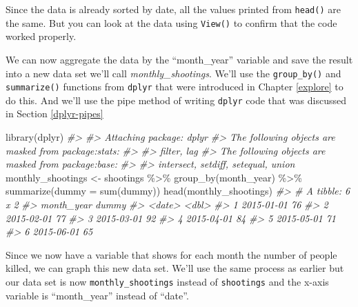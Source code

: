 \documentclass[
]{krantz}
\makeatletter
\newenvironment{Shaded}{\begin{snugshade}}{\end{snugshade}}
\newcommand{\AttributeTok}[1]{\textcolor[rgb]{0.61,0.61,0.61}{#1}}
\newcommand{\CommentTok}[1]{\textcolor[rgb]{0.37,0.37,0.37}{\textit{#1}}}
\newcommand{\FunctionTok}[1]{\textcolor[rgb]{0,0,0}{#1}}
\newcommand{\NormalTok}[1]{#1}
\newcommand{\OtherTok}[1]{\textcolor[rgb]{0.37,0.37,0.37}{#1}}
\newcommand{\SpecialCharTok}[1]{\textcolor[rgb]{0,0,0}{#1}}
\newenvironment{kframe}{%
\medskip{}
\setlength{\fboxsep}{.8em}
 \def\at@end@of@kframe{}%
 \ifinner\ifhmode%
  \def\at@end@of@kframe{\end{minipage}}%
  \begin{minipage}{\columnwidth}%
 \fi\fi%
 \def\FrameCommand##1{\hskip\@totalleftmargin \hskip-\fboxsep
 \colorbox{shadecolor}{##1}\hskip-\fboxsep
     \hskip-\linewidth \hskip-\@totalleftmargin \hskip\columnwidth}%
 \MakeFramed {\advance\hsize-\width
   \@totalleftmargin\z@ \linewidth\hsize
   \@setminipage}}%
 {\par\unskip\endMakeFramed%
 \at@end@of@kframe}
\renewenvironment{Shaded}{\begin{kframe}}{\end{kframe}}
\makeatother
\begin{document}
Since the data is already sorted by date, all the values printed from \texttt{head()} are the same. But you can look at the data using \texttt{View()} to confirm that the code worked properly.

We can now aggregate the data by the ``month\_year'' variable and save the result into a new data set we'll call \emph{monthly\_shootings}. We'll use the \texttt{group\_by()} and \texttt{summarize()} functions from \texttt{dplyr} that were introduced in Chapter \ref{explore} to do this. And we'll use the pipe method of writing \texttt{dplyr} code that was discussed in Section \ref{dplyr-pipes}

\begin{Shaded}
\begin{Highlighting}[]
\FunctionTok{library}\NormalTok{(dplyr)}
\CommentTok{\#\textgreater{} }
\CommentTok{\#\textgreater{} Attaching package: \textquotesingle{}dplyr\textquotesingle{}}
\CommentTok{\#\textgreater{} The following objects are masked from \textquotesingle{}package:stats\textquotesingle{}:}
\CommentTok{\#\textgreater{} }
\CommentTok{\#\textgreater{}     filter, lag}
\CommentTok{\#\textgreater{} The following objects are masked from \textquotesingle{}package:base\textquotesingle{}:}
\CommentTok{\#\textgreater{} }
\CommentTok{\#\textgreater{}     intersect, setdiff, setequal, union}
\NormalTok{monthly\_shootings }\OtherTok{\textless{}{-}}\NormalTok{ shootings }\SpecialCharTok{\%\textgreater{}\%}
  \FunctionTok{group\_by}\NormalTok{(month\_year) }\SpecialCharTok{\%\textgreater{}\%} 
  \FunctionTok{summarize}\NormalTok{(}\AttributeTok{dummy =} \FunctionTok{sum}\NormalTok{(dummy))}
\FunctionTok{head}\NormalTok{(monthly\_shootings)}
\CommentTok{\#\textgreater{} \# A tibble: 6 x 2}
\CommentTok{\#\textgreater{}   month\_year dummy}
\CommentTok{\#\textgreater{}   \textless{}date\textgreater{}     \textless{}dbl\textgreater{}}
\CommentTok{\#\textgreater{} 1 2015{-}01{-}01    76}
\CommentTok{\#\textgreater{} 2 2015{-}02{-}01    77}
\CommentTok{\#\textgreater{} 3 2015{-}03{-}01    92}
\CommentTok{\#\textgreater{} 4 2015{-}04{-}01    84}
\CommentTok{\#\textgreater{} 5 2015{-}05{-}01    71}
\CommentTok{\#\textgreater{} 6 2015{-}06{-}01    65}
\end{Highlighting}
\end{Shaded}

Since we now have a variable that shows for each month the number of people killed, we can graph this new data set. We'll use the same process as earlier but our data set is now \texttt{monthly\_shootings} instead of \texttt{shootings} and the x-axis variable is ``month\_year'' instead of ``date''.
\end{document}
